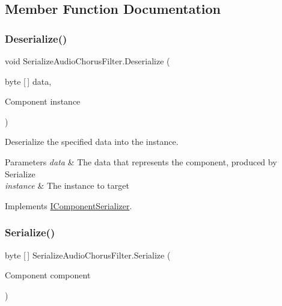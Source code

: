 \subsection{Member Function Documentation}
\mbox{\label{class_serialize_audio_chorus_filter_a2e5e9eeee7a3053843911ddd0ca0ae00}} 
\subsubsection{\texorpdfstring{Deserialize()}{Deserialize()}}
{\footnotesize\ttfamily void Serialize\+Audio\+Chorus\+Filter.\+Deserialize (\begin{DoxyParamCaption}\item[{byte \mbox{[}$\,$\mbox{]}}]{data,  }\item[{Component}]{instance }\end{DoxyParamCaption})\hspace{0.3cm}{\ttfamily [inline]}}



Deserialize the specified data into the instance. 


\begin{DoxyParams}{Parameters}
{\em data} & The data that represents the component, produced by Serialize \\
\hline
{\em instance} & The instance to target \\
\hline
\end{DoxyParams}


Implements \hyperlink{interface_i_component_serializer_a4cc366a5c78b33d47a90c209d8fed883}{I\+Component\+Serializer}.

\mbox{\label{class_serialize_audio_chorus_filter_a1cedba3237b73240c2fb96f8831dc834}} 
\subsubsection{\texorpdfstring{Serialize()}{Serialize()}}
{\footnotesize\ttfamily byte \mbox{[}$\,$\mbox{]} Serialize\+Audio\+Chorus\+Filter.\+Serialize (\begin{DoxyParamCaption}\item[{Component}]{component }\end{DoxyParamCaption})\hspace{0.3cm}{\ttfamily [inline]}}



